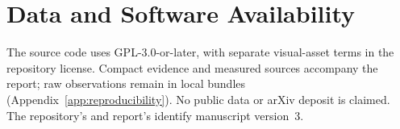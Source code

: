 \section{Data and Software Availability}
The source code uses GPL-3.0-or-later, with separate visual-asset terms in the
repository license. Compact evidence and measured sources accompany the report;
raw observations remain in local bundles (Appendix~\ref{app:reproducibility}).
No public data or arXiv deposit is claimed. The repository's
 and report's  identify manuscript version~3.
